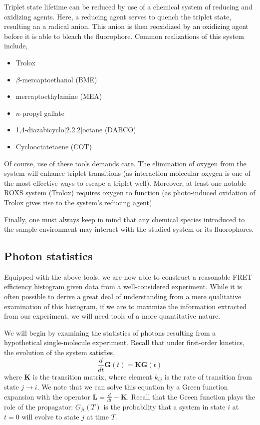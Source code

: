 \documentclass{article}
\begin{document}
Triplet state lifetime can be reduced by use of a chemical system of
reducing and oxidizing agents\cite{Vogelsang2008}. Here, a reducing
agent serves to quench the triplet state, resulting an a radical
anion. This anion is then reoxidized by an oxidizing agent before it
is able to bleach the fluorophore. Common realizations of this system
include\cite{Dave2009},
\begin{itemize}
\item Trolox\cite{Rasnik2006}
\item $\beta$-mercaptoethanol (BME)
\item mercaptoethylamine (MEA)
\item $n$-propyl gallate
\item 1,4-diazabicyclo[2.2.2]octane (DABCO)
\item Cyclooctatetaene (COT)
\end{itemize}

Of course, use of these tools demands care. The elimination of oxygen
from the system will enhance triplet transitions (as interaction
molecular oxygen is one of the most effective ways to escape a triplet
well\cite{Campos2011}). Moreover, at least one notable ROXS system
(Trolox) requires oxygen to function (as photo-induced oxidation of
Trolox gives rise to the system's reducing agent\cite{Cordes2009}).

Finally, one must always keep in mind that any chemical species
introduced to the sample environment may interact with the studied
system or its fluorophores.

\subsection{Photon statistics}
Equipped with the above tools, we are now able to construct a
reasonable FRET efficiency histogram given data from a well-considered
experiment. While it is often possible to derive a great deal of
understanding from a mere qualitative examination of this histogram,
if we are to maximize the information extracted from our experiment,
we will need tools of a more quantitative nature.

We will begin by examining the statistics of photons resulting from a
hypothetical single-molecule experiment. Recall that under first-order
kinetics, the evolution of the system satisfies,
\[ \frac{d}{dt} \mathbf{G}(t) = \mathbf{K} \mathbf{G}(t) \]
where $\mathbf{K}$ is the transition matrix, where element $k_{ij}$ is
the rate of transition from state $j \rightarrow i$. We note that we
can solve this equation by a Green function expansion with the
operator $\mathbf{L} = \frac{d}{dt} - \mathbf{K}$. Recall that the
Green function plays the role of the propagator: $G_{ji}(T)$ is the
probability that a system in state $i$ at $t=0$ will evolve to state
$j$ at time $T$.
\end{document}
